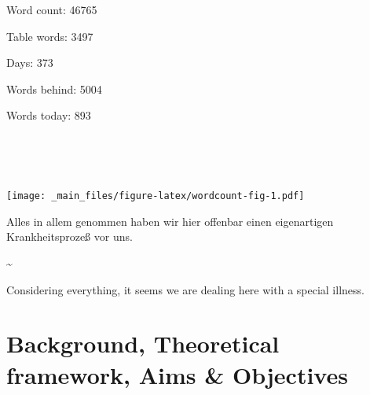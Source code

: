 \documentclass[a4paper, twoside]{templates/ociamthesis}
\begin{document}
\adjustmtc

Word count: 46765

Table words: 3497

Days: 373

Words behind: 5004

Words today: 893

~

~

\texttt{[image: \_main\_files/figure-latex/wordcount-fig-1.pdf]}

\begin{savequote}
Alles in allem genommen haben wir hier offenbar einen eigenartigen
Krankheitsprozeß vor uns.

\textasciitilde{}

Considering everything, it seems we are dealing here with a special
illness.
\end{savequote}



\hypertarget{background-heading}{%
\chapter{Background, Theoretical framework, Aims \& Objectives}\label{background-heading}}

~

\minitoc 

\newpage
\end{document}
